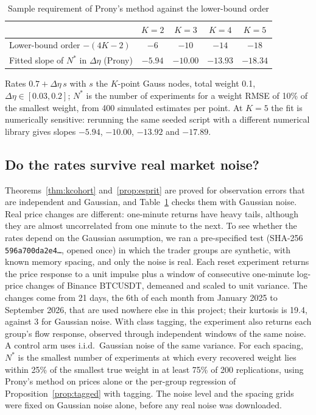 \begin{table}[t]\centering\small
\begin{threeparttable}
\caption{Sample requirement of Prony's method against the lower-bound order}\label{tab:kupper}
\begin{tabular}{lcccc}
\toprule
 & $K=2$ & $K=3$ & $K=4$ & $K=5$\\
\midrule
Lower-bound order $-(4K-2)$ & $-6$ & $-10$ & $-14$ & $-18$\\
Fitted slope of $N^*$ in $\Delta\eta$ (Prony) & $-5.94$ & $-10.00$ & $-13.93$ & $-18.34$\\
\bottomrule
\end{tabular}
\begin{tablenotes}\footnotesize\item Rates $0.7+\Delta\eta\,s$ with $s$ the $K$-point Gauss nodes, total weight 0.1, $\Delta\eta\in[0.03,0.2]$; $N^*$ is the number of experiments for a weight RMSE of 10\% of the smallest weight, from 400 simulated estimates per point. At $K=5$ the fit is numerically sensitive: rerunning the same seeded script with a different numerical library gives slopes $-5.94$, $-10.00$, $-13.92$ and $-17.89$. \end{tablenotes}
\end{threeparttable}
\end{table}

\subsection{Do the rates survive real market noise?}\label{sec:injection}

Theorems~\ref{thm:kcohort} and~\ref{prop:esprit} are proved for observation errors that are independent and Gaussian, and Table~\ref{tab:kupper} checks them with Gaussian noise. Real price changes are different: one-minute returns have heavy tails, although they are almost uncorrelated from one minute to the next. To see whether the rates depend on the Gaussian assumption, we ran a pre-specified test (SHA-256 \texttt{596a700da2e4\ldots}, opened once) in which the trader groups are synthetic, with known memory spacing, and only the noise is real. Each reset experiment returns the price response to a unit impulse plus a window of consecutive one-minute log-price changes of Binance BTCUSDT, demeaned and scaled to unit variance. The changes come from 21 days, the 6th of each month from January 2025 to September 2026, that are used nowhere else in this project; their kurtosis is 19.4, against 3 for Gaussian noise. With class tagging, the experiment also returns each group's flow response, observed through independent windows of the same noise. A control arm uses i.i.d.\ Gaussian noise of the same variance. For each spacing, $N^*$ is the smallest number of experiments at which every recovered weight lies within 25\% of the smallest true weight in at least 75\% of 200 replications, using Prony's method on prices alone or the per-group regression of Proposition~\ref{prop:tagged} with tagging. The noise level and the spacing grids were fixed on Gaussian noise alone, before any real noise was downloaded.

